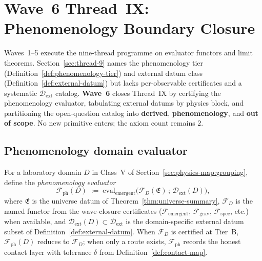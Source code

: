 \section{Wave~6 Thread~IX: Phenomenology Boundary Closure}
\label{sec:wave6-thread9}

Waves~1--5 execute the nine-thread programme on evaluator functors and limit
theorems. Section~\ref{sec:thread-9} names the phenomenology tier
(Definition~\ref{def:phenomenology-tier}) and external datum class
(Definition~\ref{def:external-datum}) but lacks per-observable certificates and
a systematic $\mathcal{D}_{\mathrm{ext}}$ catalog. \textbf{Wave~6} closes
Thread~IX by certifying the phenomenology evaluator, tabulating external datums
by physics block, and partitioning the open-question catalog into
\textbf{derived}, \textbf{phenomenology}, and \textbf{out of scope}. No new
primitive enters; the axiom count remains $2$.

\subsection{Phenomenology domain evaluator}
\label{sec:wave6-thread9:evaluator}

\begin{definition}
\label{def:thread-9-evaluator}
For a laboratory domain $D$ in Class~V of
Section~\ref{sec:physics-map:grouping}, define the \emph{phenomenology
evaluator}
\begin{equation}\label{eq:thread9-evaluator}
  \mathcal{F}_{\mathrm{ph}}(D)
  \;:=\;
  \mathrm{eval}_{\mathrm{emergent}}\!\bigl(
    \mathcal{F}_D(\mathfrak{E})\,;\,
    \mathcal{D}_{\mathrm{ext}}(D)
  \bigr),
\end{equation}
where $\mathfrak{E}$ is the universe datum of Theorem~\ref{thm:universe-summary},
$\mathcal{F}_D$ is the named functor from the wave-closure certificates
($\mathcal{F}_{\mathrm{emergent}}$, $\mathcal{F}_{\mathrm{grav}}$,
$\mathcal{F}_{\mathrm{spec}}$, etc.) when available, and
$\mathcal{D}_{\mathrm{ext}}(D)\subset\mathcal{D}_{\mathrm{ext}}$ is the
domain-specific external datum subset of Definition~\ref{def:external-datum}.
When $\mathcal{F}_D$ is certified at Tier~B, $\mathcal{F}_{\mathrm{ph}}(D)$
reduces to $\mathcal{F}_D$; when only a route exists, $\mathcal{F}_{\mathrm{ph}}$
records the honest contact layer with tolerance $\delta$ from
Definition~\ref{def:contact-map}.
\end{definition}

